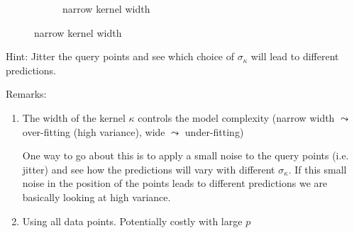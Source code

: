 \begin{frame}
\begin{figure}[ht]
\begin{subfigure}[t]{0.37\textwidth}
{         }
         \caption{narrow kernel width}
         \label{fig:linear}
     \end{subfigure}
\end{figure}


\pause

Hint: Jitter the query points and see which choice of $\sigma_{\kappa}$ will lead to different predictions.

\end{frame}

\begin{frame}

Remarks:
\begin{enumerate}
\item The width of the kernel $\kappa$ controls the model complexity (narrow width $\leadsto$ over-fitting (high variance), wide $\leadsto$ under-fitting)
 
One way to go about this is to apply a small noise to the query points (i.e. jitter) and see how the predictions will vary with different $\sigma_{\kappa}$. If this small noise in the position of the points leads to different predictions we are basically looking at high variance.

\item Using all data points. Potentially costly with large $p$
\end{enumerate}
\end{frame}
